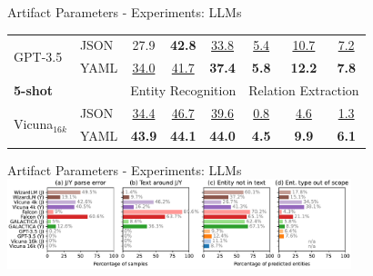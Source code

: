 \documentclass[en,16:9,smallfoot]{sdqbeamer}
\begin{document}
\begin{frame}{Artifact Parameters - Experiments: LLMs}
\begin{table}
\begin{small}
\begin{tabular}{ll|ccc|ccc}
        \multirow{2}{*}{GPT-3.5} &
        JSON & 27.9 & \textbf{42.8} & \underline{33.8}
                  & \underline{5.4} & \underline{10.7} & \underline{7.2} \\
        \ & YAML & \underline{34.0} & \underline{41.7} &
        \hphantom{${}_{\Delta\text{+3.6}}$}
        \textbf{37.4}{\color{parametergreen}{${}_{\Delta\text{+3.6}}$}}
                  & \textbf{5.8} & \textbf{12.2} &
        \hphantom{${}_{\Delta\text{+0.6}}$}
        \textbf{7.8}{\color{parametergreen}{${}_{\Delta\text{+0.6}}$}}  \\

      \hline
        \multicolumn{2}{l|}{\textbf{5-shot}} &
        \multicolumn{3}{c|}{Entity Recognition} &
        \multicolumn{3}{c}{Relation Extraction} \\
      \hline

        \multirow{2}{*}{Vicuna${}_{16k}$} &
        JSON & \underline{34.4} & \underline{46.7} & \underline{39.6}
                  & \underline{0.8} & \underline{4.6} & \underline{1.3} \\
        \ & YAML & \textbf{43.9} & \textbf{44.1} &
        \hphantom{${}_{\Delta\text{+0.4}}$}
        \textbf{44.0}{\color{parametergreen}{${}_{\Delta\text{+0.4}}$}}
                  & \textbf{4.5} & \textbf{9.9} &
        \hphantom{${}_{\Delta\text{+4.8}}$}
        \textbf{6.1}{\color{parametergreen}{${}_{\Delta\text{+4.8}}$}}  \\
      \hline
      \end{tabular}
     \end{small}
    \end{table}
   \end{frame}

   \begin{frame}{Artifact Parameters - Experiments: LLMs}
       \centering
       \includegraphics[width=0.75\textwidth]{imgs/llm_format_eval_mix}
   \end{frame}
\end{document}

